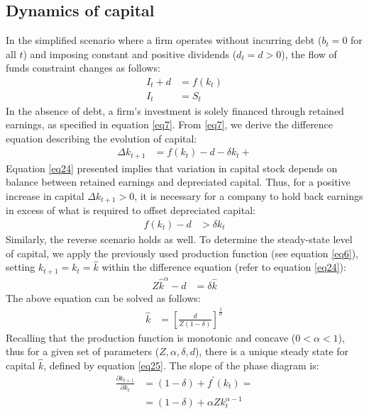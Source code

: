 \documentclass[12pt]{report}
\begin{document}
\subsection{Dynamics of capital}
In the
simplified scenario where a firm operates without incurring debt (\(b_t = 0\) for all \(t\)) and imposing constant and
positive dividends (\(d_t=d>0\)), the flow of funds constraint changes as follows:
\begin{align}
    I_t + d &= f(k_{t}) \\
    I_t &= S_t \label{eq7}
\end{align}
In the absence of debt, a firm's investment is solely financed through retained earnings, as
specified in equation \ref{eq7}. From \ref{eq7}, we derive the difference equation describing the evolution of capital:
\begin{align}
    \Delta{k_{t+1}} &= f(k_{t}) - d -\delta k_t +  \label{eq24}
\end{align}
Equation \autoref{eq24} presented implies that variation in capital stock depends on balance between retained earnings and
depreciated capital. Thus, for a positive increase in capital \(\Delta{k_{t+1}} > 0\), it is necessary for a company to
hold back earnings in excess of what is required to offset depreciated capital:
\begin{align*}
    f(k_{t}) - d &> \delta k_t
\end{align*}
Similarly, the reverse scenario holds as well.
To determine the steady-state level of capital, we apply the previously used production function (see equation \ref{eq6}),
setting \(k_{t+1}=k_{t}=\hat{k}\) within the difference equation (refer to equation \ref{eq24}): 
\begin{align}
    Z \hat{k}^{\alpha} - d&=  \delta \hat{k}
\end{align}
The above equation can be solved as follows:
\begin{align}
     \hat{k} &=  \left[\frac{d}{Z(1-\delta)}\right]^{\frac{1}{\alpha}} \label{eq25}
\end{align}
Recalling that the production function is monotonic and concave (\(0<\alpha<1\)), thus for a given set of parameters
(\(Z,\alpha,\delta,d\)), there is a unique steady state for capital \(\hat{k}\), defined by equation \ref{eq25}.
The slope of the phase diagram is:
\begin{align}
    \frac{\partial k_{t+1}}{\partial k_{t}} &= (1-\delta) + f^{\prime}(k_{t}) = \\
     &= (1-\delta) + \alpha Z k_{t}^{\alpha-1} \label{eq8}
\end{align}
\end{document}
